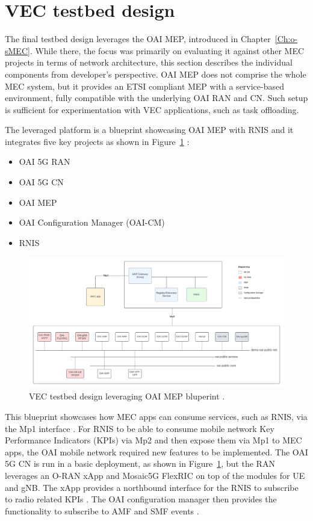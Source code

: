 \documentclass[12pt,a4paper,twoside]{report}
\begin{document}
\section{VEC testbed design}
The final testbed design leverages the OAI MEP, introduced in Chapter~\ref{Ch:o-sMEC}. While there, the focus was primarily on evaluating it against other MEC projects in terms of network architecture, this section describes the individual components from developer’s perspective. OAI MEP does not comprise the whole MEC system, but it provides an ETSI compliant MEP with a service-based environment, fully compatible with the underlying OAI RAN and CN. Such setup is sufficient for experimentation with VEC applications, such as task offloading.

The leveraged platform is a blueprint showcasing OAI MEP with RNIS and it integrates five key projects as shown in Figure~\ref{F:VEC-tstbed-arch} \cite{oai-blueprint-git}:
%
\begin{itemize}
	\item OAI 5G RAN
	\item OAI 5G CN
	\item OAI MEP
	\item OAI Configuration Manager (OAI-CM)
	\item RNIS
\end{itemize}
%
\begin{figure}[ht]
	\centering
	\begin{sideways}
		\includegraphics[width=20cm]{./images/OAI-MEP-parts.png} 	
	\end{sideways}
	\caption{VEC testbed design leveraging OAI MEP bluperint \cite{oai-blueprint-git}.}
	\label{F:VEC-tstbed-arch}
\end{figure}
%
\FloatBarrier
This blueprint showcases how MEC apps can consume services, such as RNIS, via the Mp1 interface \cite{oai-blueprint-git}. For RNIS to be able to consume mobile network Key Performance Indicators (KPIs) via Mp2 and then expose them via Mp1 to MEC apps, the OAI mobile network required new features to be implemented. The OAI 5G CN is run in a basic deployment, as shown in Figure~\ref{F:VEC-tstbed-arch}, but the RAN leverages an O-RAN xApp and Mosaic5G FlexRIC on top of the modules for UE and gNB. The xApp provides a northbound interface for the RNIS to subscribe to radio related KPIs \cite{oai-rnis-git}. The OAI configuration manager then provides the functionality to subscribe to AMF and SMF events \cite{oai-cm-git}.
\end{document}
